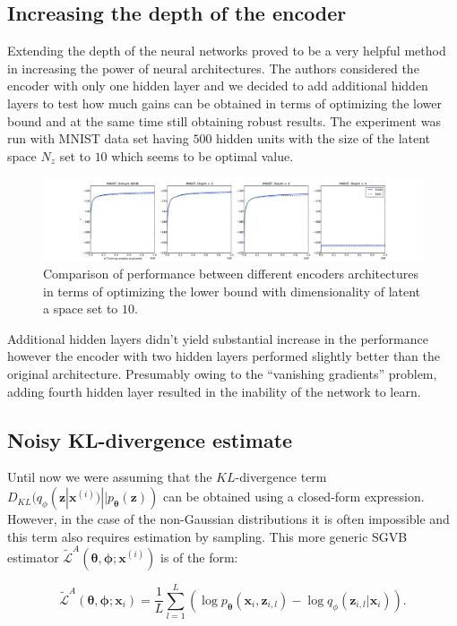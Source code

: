 \documentclass[../report/report.tex]{subfiles}
\begin{document}
\subsection{Increasing the depth of the encoder}
Extending the depth of the neural networks proved to be a very helpful method in increasing the power of neural architectures. The authors considered the encoder with only one hidden layer and we decided to add additional hidden layers to test how much gains can be obtained in terms of optimizing the lower bound and at the same time still obtaining robust results. The experiment was run with MNIST data set having $500$ hidden units with the size of the latent space $N_z$ set to $10$ which seems to be optimal value. 

\begin{figure}[!htb]
\centering
\includegraphics[width=0.8\linewidth]{../../res/mnist_depth}
  \caption[1]{Comparison of performance between different encoders architectures in terms of optimizing the lower bound with dimensionality of latent a space set to $10$. }
\end{figure}

Additional hidden layers didn't yield substantial increase in the performance however the encoder with two hidden layers performed slightly better than the original architecture. Presumably owing to the ``vanishing gradients'' problem, adding fourth hidden layer resulted in the inability of the network to learn.

\subsection{Noisy KL-divergence estimate}
Until now we were assuming that the $KL$-divergence term $D_{KL} (q_{\phi}(\mathbf{z} | \mathbf{x}^{(i)}) || p_{\boldsymbol{\theta}}( \mathbf{z}) ) $ can be obtained using a closed-form expression. However, in the case of the non-Gaussian distributions it is often impossible and this term also requires estimation by sampling. This more generic SGVB estimator $\widetilde{\mathcal{L}}^{A}(\boldsymbol{\theta}, \boldsymbol{\phi}; \mathbf{x}^{(i)})$ is of the form:

$$ \widetilde{\mathcal{L}}^{A}(\boldsymbol{\theta}, \boldsymbol{\phi}; \mathbf{x}_{i}) = \frac{1}{L} \sum_{l=1}^L \left( \log p_{\boldsymbol{\theta}}(\mathbf{x}_{i}, \mathbf{z}_{i,l}) - \log q_{\phi}(\mathbf{z}_{i,l} | \mathbf{x}_i) \right).$$
\end{document}
